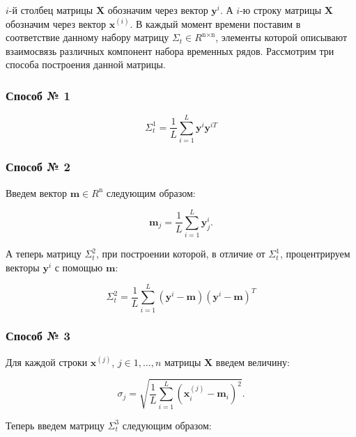 \documentclass{article}
\begin{document}
$i$-й столбец матрицы $\textbf{X}$ обозначим через вектор $\textbf{y}^{i}$. А $i$-ю строку матрицы $\textbf{X}$ обозначим через вектор $\textbf{x}^{(i)}$.   В каждый момент времени поставим в соответствие данному набору матрицу $\Sigma_t \in R^{\text{n} \times \text{n}}$, элементы которой описывают взаимосвязь различных компонент набора временных рядов. Рассмотрим три способа построения данной матрицы.

\subsubsection{Способ № 1}


\begin{equation}
\Sigma_t^{1} = \dfrac{1}{L}\sum\limits_{i = 1}^{L} \textbf{y}^{i} \textbf{y}^{iT}
\end{equation}

\subsubsection{Способ № 2}


Введем вектор $\mathbf{m} \in R^{\text{n}}$ следующим образом:


\begin{equation}
\mathbf{m}_j = \dfrac1L \sum\limits_{i = 1}^{L} \textbf{y}^{i}_j.
\end{equation}


А теперь матрицу $\Sigma_t^{2}$, при построении которой, в отличие от $\Sigma_t^{1}$, процентрируем векторы $\textbf{y}^{i}$ с помощью  $\textbf{m}$: 


\begin{equation}
\Sigma_t^{2} = \dfrac{1}{L}\sum\limits_{i = 1}^{L} (\textbf{y}^{i} - \textbf{m}) (\textbf{y}^{i} - \textbf{m})^T
\end{equation}

\subsubsection{Способ № 3}

Для каждой строки $\textbf{x}^{(j)}$, $j \in {1, \ldots, n}$ матрицы $\textbf{X}$ введем величину:


\begin{equation}
\sigma_j = \sqrt{\dfrac{1}{L} \sum\limits_{i = 1}^L (\textbf{x}^{(j)}_i - \textbf{m}_i)^2}.
\end{equation}


Теперь введем матрицу $\Sigma_t^3$ следующим образом:
\end{document}
